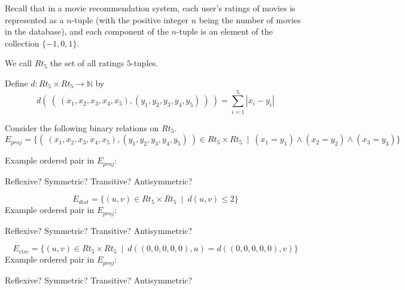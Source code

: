 
Recall that 
in a movie recommendation system, each 
user's ratings of movies is represented as a $n$-tuple 
(with the positive integer $n$ 
being the number of movies in the database), 
and each component of 
the $n$-tuple is an element of the collection $\{-1,0,1\}$. 

We call $Rt_5$ the set of all ratings $5$-tuples.

Define $d: Rt_5 \times Rt_5 \to \mathbb{N}$ by
\[
    d (~(~ (x_1, x_2, x_3, x_4, x_5), (y_1, y_2, y_3, y_4, y_5) ~) ~) = \sum_{i=1}^5 |x_i - y_i|
\]

Consider the following binary relations on $Rt_5$.
\[
    E_{proj} =  \{ ( ~(x_1, x_2, x_3, x_4, x_5), (y_1, y_2, y_3, y_4, y_5)~) \in
         Rt_5 \times Rt_5 ~\mid~(x_1 = y_1) \land  (x_2 = y_2) \land (x_3 = y_3) \}
\]

Example ordered pair in $E_{proj}$: 

\vspace{20pt}

Reflexive? Symmetric? Transitive? Antisymmetric?

\vspace{50pt}



\[
    E_{dist} =  \{ (u,v) \in Rt_5 \times Rt_5 ~\mid~ d( u,v ) \leq 2 \}
\]
Example ordered pair in $E_{proj}$: 

\vspace{20pt}

Reflexive? Symmetric? Transitive? Antisymmetric?

\vspace{50pt}


\[
    E_{circ} =  \{ (u,v) \in Rt_5 \times Rt_5 ~\mid~ d( (0,0,0,0,0), u ) =  d( (0,0,0,0,0),v) \}
\]
Example ordered pair in $E_{proj}$: 

\vspace{20pt}

Reflexive? Symmetric? Transitive? Antisymmetric?

\vspace{50pt}

